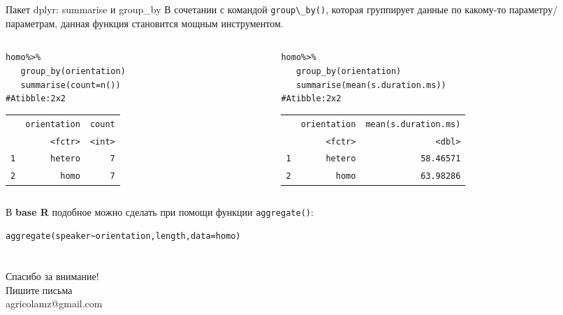 \begin{frame}{Пакет dplyr: summarise и group\_by}
В сочетании с командой \scriptsize\verb"group\_by()"\normalsize, которая группирует данные по какому-то параметру/параметрам, данная функция становится мощным инструментом.
\begin{columns}[T] 
\begin{column}{.38\textwidth}
\scriptsize
\begin{alltt}
homo \%>\%\\
\ \ \ \alert{group\_by}(orientation) \\
\ \ \ \alert{summarise}(count = n())\\
\# A tibble: 2 x 2\\
\begin{tabular}{rrr}
&  orientation & count\\
&     <fctr>             &  <int>\\
1  &     hetero  &         7\\
2  &     homo &          7\\
\end{tabular}
\end{alltt}
\end{column}
\hfill
\begin{column}{.58\textwidth}
\scriptsize
\begin{alltt}
homo \%>\%\\
\ \ \ \alert{group\_by}(orientation) \\
\ \ \ \alert{summarise}(mean(s.duration.ms))\\
\# A tibble: 2 x 2\\
\begin{tabular}{rrr}
&  orientation & mean(s.duration.ms)\\
&     <fctr>             &  <dbl>\\
1  &     hetero  &         58.46571\\
2  &     homo &          63.98286\\
\end{tabular}
\end{alltt}
\normalsize
\end{column}
\end{columns}
\vfill
В \textbf{base R} подобное можно сделать при помощи функции \scriptsize\verb"aggregate()"\normalsize:
\scriptsize
\begin{alltt}
\alert{aggregate}(speaker\textasciitilde orientation, length, data = homo)
\end{alltt}
\normalsize
\end{frame}
\section{}
\begin{frame}
{\huge Спасибо за внимание!\bigskip\\
\normalsize Пишите письма\\
agricolamz@gmail.com
\vspace{-130pt}}
\end{frame}
